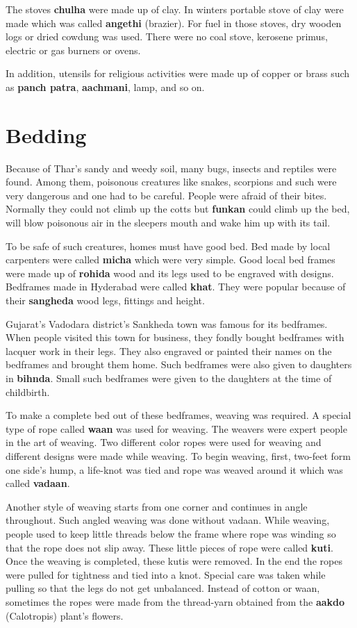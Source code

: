 The stoves \textbf{chulha} were made up of clay. In winters portable stove of
clay were made which was called \textbf{angethi} (brazier). For fuel in those stoves, dry
wooden logs or dried cowdung was used. There were no coal stove, kerosene
primus, electric or gas burners or ovens.

In addition, utensils for religious activities were made up of copper or brass
such as \textbf{panch patra}, \textbf{aachmani}, lamp, and so on.

\section{Bedding}
Because of Thar's sandy and weedy soil, many bugs, insects and reptiles were
found. Among them, poisonous creatures like snakes, scorpions and such were very
dangerous and one had to be careful. People were afraid of their bites. Normally
they could not climb up the cotts but \textbf{funkan} could climb up the bed,
will blow poisonous air in the sleepers mouth and wake him up with its tail.

To be safe of such creatures, homes must have good bed. Bed made by local
carpenters were called \textbf{micha} which were very simple. Good local bed
frames were made up of \textbf{rohida} wood and its legs used to be engraved with
designs. Bedframes made in Hyderabad were called \textbf{khat}. They were popular
because of their \textbf{sangheda} wood legs, fittings and height.

Gujarat's Vadodara district's Sankheda town was famous for its bedframes. When
people visited this town for business, they fondly bought bedframes with lacquer
work in their legs. They also engraved or painted their names on the bedframes and
brought them home. Such bedframes were also given to daughters in \textbf{bihnda}.
Small such bedframes were given to the daughters at the time of childbirth.

To make a complete bed out of these bedframes, weaving was required. A special
type of rope called \textbf{waan} was used for weaving. The weavers were expert
people in the art of weaving. Two different color ropes were used for weaving
and different designs were made while weaving. To begin weaving, first, two-feet form one
side's hump, a life-knot was tied and rope was weaved around it which was called
\textbf{vadaan}.

Another style of  weaving starts from one corner and continues in angle throughout. Such
angled weaving was done without vadaan. While weaving, people used to keep
little threads below the frame where rope was winding so that the rope does not
slip away. These little pieces of rope were called \textbf{kuti}. Once the
weaving is completed, these kutis were removed. In the end the ropes were pulled
for tightness and tied into a knot. Special care was taken while pulling so that
the legs do not get unbalanced. Instead of cotton or waan, sometimes the ropes
were made from the thread-yarn obtained from the \textbf{aakdo} (Calotropis) plant's flowers.

